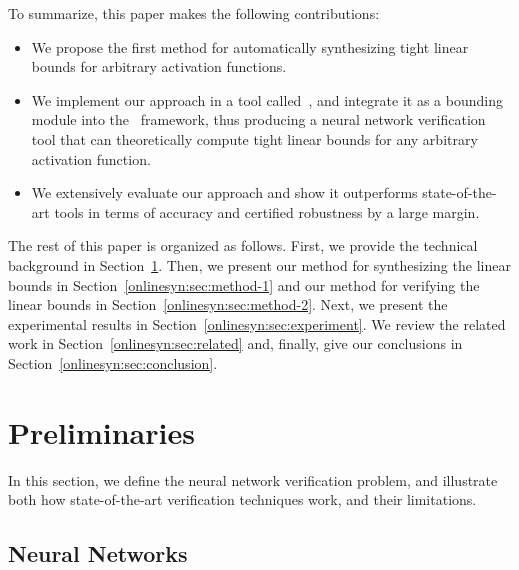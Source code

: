 
To summarize, this paper makes the following contributions:
\begin{itemize}
	\item We propose the first method for automatically synthesizing  tight linear bounds for
	arbitrary activation functions.
	\item We implement our approach in a tool called~\Name{}, and integrate it
	as a bounding module into the~\autolipra{} framework, thus producing a
	neural network verification tool that can theoretically compute tight linear
	bounds for any arbitrary activation function.
	\item We extensively evaluate our approach and show it outperforms
	state-of-the-art tools in terms of accuracy and certified robustness by a
	large margin.
\end{itemize}


The rest of this paper is organized as follows.  First, we provide the
technical background in Section~\ref{onlinesyn:sec:preliminaries}.  Then, we
present our method for synthesizing the linear bounds in
Section~\ref{onlinesyn:sec:method-1} and our method for verifying the linear
bounds in Section~\ref{onlinesyn:sec:method-2}.  Next, we present the
experimental results in Section~\ref{onlinesyn:sec:experiment}.  We review the
related work in Section~\ref{onlinesyn:sec:related} and, finally, give our
conclusions in Section~\ref{onlinesyn:sec:conclusion}.



\section{Preliminaries}
\label{onlinesyn:sec:preliminaries}

In this section, we define the neural network verification problem, and
illustrate both how state-of-the-art verification techniques work, and their
limitations.

\subsection{Neural Networks}


